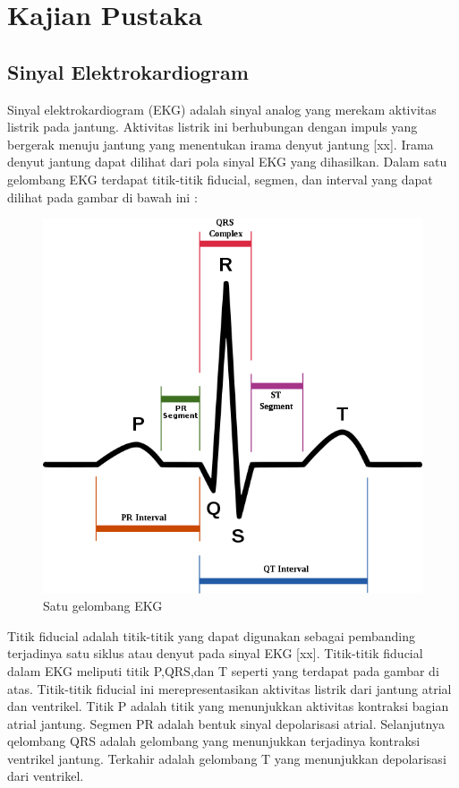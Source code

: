 \chapter{Kajian Pustaka}

\section{Sinyal Elektrokardiogram}
Sinyal elektrokardiogram (EKG) adalah sinyal analog yang merekam aktivitas listrik pada jantung. Aktivitas listrik ini berhubungan dengan impuls yang bergerak menuju jantung yang menentukan irama denyut jantung [xx]. Irama denyut jantung dapat dilihat dari pola sinyal EKG yang dihasilkan. Dalam satu gelombang EKG terdapat titik-titik fiducial, segmen, dan interval yang dapat dilihat pada gambar di bawah ini :

	\begin{figure}[h!]
		\centering
		\includegraphics[scale=0.5]{ekg.png}
		\caption{Satu gelombang EKG}
		\label{fig:ecg_signal}
	\end{figure}

Titik fiducial adalah titik-titik yang dapat digunakan sebagai pembanding terjadinya satu siklus atau denyut pada sinyal EKG [xx]. Titik-titik fiducial dalam EKG meliputi titik P,QRS,dan T seperti yang terdapat pada gambar di atas. Titik-titik fiducial ini  merepresentasikan aktivitas listrik dari jantung atrial dan ventrikel. Titik P adalah titik yang menunjukkan aktivitas kontraksi bagian atrial jantung. Segmen PR adalah bentuk sinyal depolarisasi atrial. Selanjutnya qelombang QRS adalah gelombang yang menunjukkan terjadinya kontraksi ventrikel jantung. Terkahir adalah gelombang T yang menunjukkan depolarisasi dari ventrikel.

